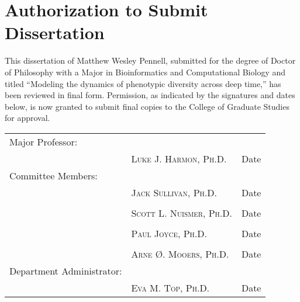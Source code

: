 \chapter*{Authorization to Submit Dissertation}

This dissertation of Matthew Wesley Pennell, submitted for the degree of Doctor of Philosophy with a Major in Bioinformatics and Computational Biology and titled ``Modeling the dynamics of phenotypic diversity across deep time,'' has been reviewed in final form. Permission, as indicated by the signatures and dates below, is now granted to submit final copies to the College of Graduate Studies for approval.

\vspace{1in}

\begin{center}
\begin{tabular}{ p{}  p{}  p{} }
Major Professor: & \hrulefill & \hrulefill\\[-8pt]
 & \textsc{Luke J. Harmon, Ph.D.} & Date\\[18pt]
Committee Members: & \hrulefill & \hrulefill\\[-8pt]
 & \textsc{Jack Sullivan, Ph.D.} & Date\\[18pt]
 & \hrulefill & \hrulefill\\[-8pt]
 & \textsc{Scott L. Nuismer, Ph.D.} & Date\\[18pt]
& \hrulefill & \hrulefill\\[-8pt]
 & \textsc{Paul Joyce, Ph.D.} & Date\\[18pt]
& \hrulefill & \hrulefill\\[-8pt]
 & \textsc{Arne {\O}. Mooers, Ph.D.} & Date\\[18pt]
Department Administrator: & \hrulefill & \hrulefill\\[-8pt]
 & \textsc{Eva M. Top, Ph.D.} & Date\\[18pt]
\end{tabular}
\end{center}


 
